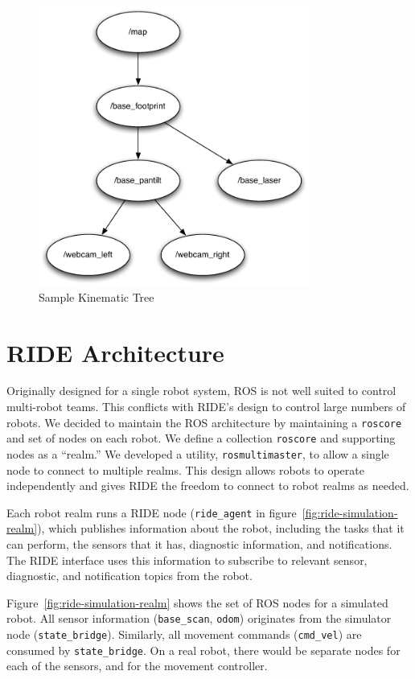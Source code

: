 \begin{figure}[ht]
\begin{center}
\includegraphics[width=3.5in]{images/tf-example.pdf}
\caption{Sample Kinematic Tree\label{fig:tf-example}}
\end{center}
\end{figure}

\section{RIDE Architecture}
\label{sec:ride_code}
Originally designed for a single robot system, ROS is not well suited to control multi-robot teams. This conflicts with RIDE's design to control large numbers of robots. We decided to maintain the ROS architecture by maintaining a \verb!roscore! and set of nodes on each robot. We define a collection \verb!roscore! and supporting nodes as a ``realm.'' We developed a utility, \verb!rosmultimaster!, to allow a single node to connect to multiple realms. This design allows robots to operate independently and gives RIDE the freedom to connect to robot realms as needed.

Each robot realm runs a RIDE node (\verb!ride_agent! in figure~\ref{fig:ride-simulation-realm}), which publishes information about the robot, including the tasks that it can perform, the sensors that it has, diagnostic information, and notifications. The RIDE interface uses this information to subscribe to relevant sensor, diagnostic, and notification topics from the robot.

Figure~\ref{fig:ride-simulation-realm} shows the set of ROS nodes for a simulated robot. All sensor information (\verb!base_scan!, \verb!odom!) originates from the simulator node (\verb!state_bridge!). Similarly, all movement commands (\verb!cmd_vel!) are consumed by \verb!state_bridge!. On a real robot, there would be separate nodes for each of the sensors, and for the movement controller.

